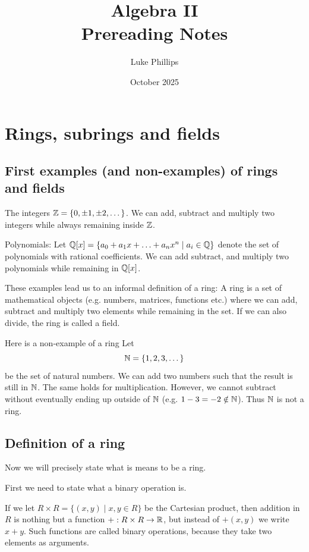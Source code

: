 \documentclass[10pt, a4paper]{article}
\title{Algebra II \\
    \large Prereading Notes}
\author{Luke Phillips}
\date{October 2025}
\begin{document}
\maketitle

\newpage

\tableofcontents

\newpage

\section{Rings, subrings and fields}

\subsection{First examples
(and non-examples)
of rings and fields}

The integers $\mathbb{Z} = \{0, \pm 1, \pm 2, \dotsc\}$.
We can add,
subtract and multiply two integers while always remaining inside $\mathbb{Z}$.

Polynomials:
Let $\mathbb{Q}[x] = \{a_0 + a_1x + \dotsc + a_nx ^ n \mid a_i \in \mathbb{Q}\}$ denote the set of polynomials with rational coefficients.
We can add
subtract,
and multiply two polynomials while remaining in $\mathbb{Q}[x]$.

These examples lead us to an informal definition of a ring:
A ring is a set of mathematical objects
(e.g. numbers,
matrices,
functions etc.)
where we can add,
subtract and multiply two elements while remaining in the set.
If we can also divide,
the ring is called a field.

Here is a non-example of a ring
Let
\[
\mathbb{N} = \{1, 2, 3, \dotsc\}
\]
be the set of natural numbers.
We can add two numbers such that the result is still in $\mathbb{N}$.
The same holds for multiplication.
However,
we cannot subtract without eventually ending up outside of $\mathbb{N}$
(e.g. $1 - 3 = -2 \notin \mathbb{N}$).
Thus $\mathbb{N}$ is not a ring.


\subsection{Definition of a ring}
Now we will precisely state what is means to be a ring.

First we need to state what a binary operation is.

If we let $R \times R = \{(x, y) \mid x, y \in R\}$ be the Cartesian product,
then addition in $R$ is nothing but a function $+ : R \times R \to \mathbb{R}$,
but instead of $+(x, y)$ we write $x + y$.
Such functions are called binary operations,
because they take two elements as arguments.
\end{document}

